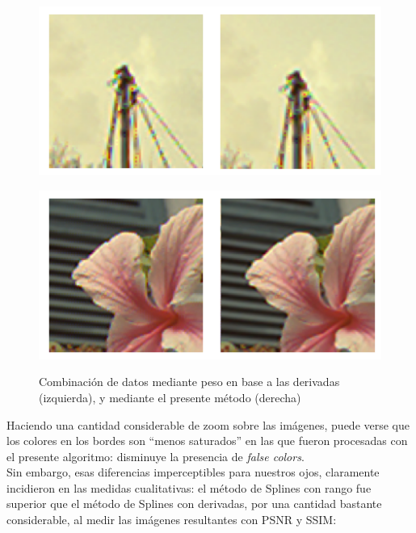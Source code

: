 \documentclass[a4paper]{article}
\begin{document}
\begin{figure}[h!]
	\begin{center}
	    \includegraphics[scale=0.47]{imagenes/Splines/RecortesSplines/rango/asta.png}\\
	\end{center}
	\begin{center}
	    \includegraphics[scale=0.47]{imagenes/Splines/RecortesSplines/rango/flor.png}\\
	\end{center}
	\caption{Combinación de datos mediante peso en base a las derivadas (izquierda), y mediante el presente método (derecha)}
	\label{splines5}
\end{figure}

Haciendo una cantidad considerable de zoom sobre las imágenes, puede verse que los colores en los bordes son ``menos saturados'' en las que fueron procesadas con el presente algoritmo: disminuye la presencia de \textit{false colors}.\\

Sin embargo, esas diferencias imperceptibles para nuestros ojos, claramente incidieron en las medidas cualitativas: el método de Splines con rango fue superior que el método de Splines con derivadas, por una cantidad bastante considerable, al medir las imágenes resultantes con PSNR y SSIM:
\end{document}
